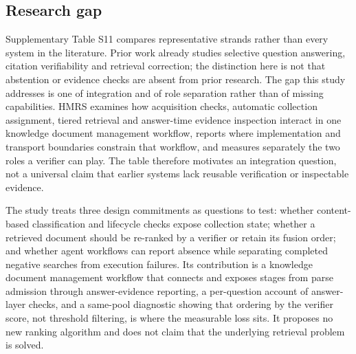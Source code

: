 \subsection{Research gap}
\label{sec:gap}

Supplementary Table S11 compares representative strands rather than every
system in the literature. Prior work already studies selective question
answering, citation verifiability and retrieval correction; the distinction
here is not that abstention or evidence checks are absent from prior research.
The gap this study addresses is one of integration and of role separation
rather than of missing capabilities. HMRS examines how acquisition checks,
automatic collection assignment, tiered retrieval and answer-time evidence
inspection interact in one knowledge document management workflow, reports
where implementation and transport boundaries constrain that workflow, and
measures separately the two roles a verifier can play. The table therefore motivates an
integration question, not a universal claim that earlier systems lack reusable
verification or inspectable evidence.

The study treats three design commitments as questions to test: whether
content-based classification and lifecycle checks expose collection state;
whether a retrieved document should be re-ranked by a verifier or retain its
fusion order; and whether agent workflows can report absence while separating
completed negative searches from execution failures. Its contribution is a
knowledge document management workflow that connects and exposes stages from
parse admission through answer-evidence reporting, a per-question account of
answer-layer checks, and a same-pool diagnostic showing that ordering by the
verifier score, not threshold filtering, is where the measurable loss sits. It
proposes no new ranking algorithm and does not claim that the underlying
retrieval problem is solved.



